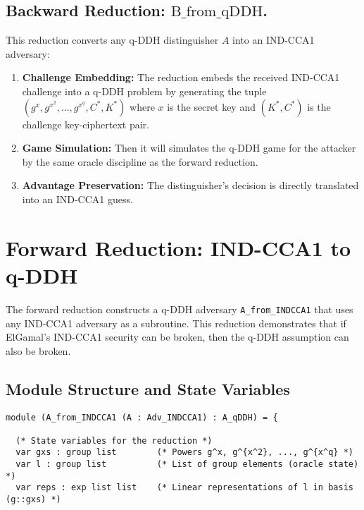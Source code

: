 \subsection{Backward Reduction: ${\text{B\_from\_qDDH}}$.} This reduction converts any q-DDH distinguisher $A$ into an IND-CCA1 adversary:
\begin{enumerate}
\item \textbf{Challenge Embedding:} The reduction embeds the received IND-CCA1 challenge into a q-DDH problem by generating the tuple $(g^x, g^{x^2}, \ldots, g^{x^q}, C^*, K^*)$ where $x$ is the secret key and $(K^*, C^*)$ is the challenge key-ciphertext pair.
\item \textbf{Game Simulation:} Then it will simulates the q-DDH game for the attacker by the same oracle discipline as the forward reduction.
\item \textbf{Advantage Preservation:} The distinguisher's decision is directly translated into an IND-CCA1 guess.
\end{enumerate}

















\section{Forward Reduction: IND-CCA1 to q-DDH}
\label{sec:forward-reduction4}

The forward reduction constructs a q-DDH adversary \texttt{A\_from\_INDCCA1} that uses any IND-CCA1 adversary as a subroutine. This reduction demonstrates that if ElGamal's IND-CCA1 security can be broken, then the q-DDH assumption can also be broken.

\subsection{Module Structure and State Variables}

\begin{lstlisting}[style=easycrypt, caption=A\_from\_INDCCA1 Module Structure, breaklines=true, breakatwhitespace=true, frame=single, keepspaces=true]
module (A_from_INDCCA1 (A : Adv_INDCCA1) : A_qDDH) = {
  
  (* State variables for the reduction *)
  var gxs : group list        (* Powers g^x, g^{x^2}, ..., g^{x^q} *)
  var l : group list          (* List of group elements (oracle state) *)
  var reps : exp list list    (* Linear representations of l in basis (g::gxs) *)
\end{lstlisting}

